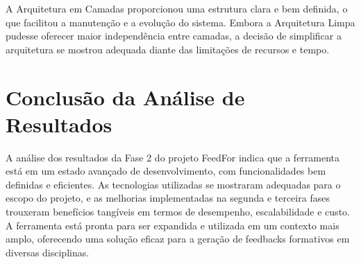 A Arquitetura em Camadas proporcionou uma estrutura clara e bem definida, o que facilitou a manutenção e a evolução do sistema. Embora a Arquitetura Limpa pudesse oferecer maior independência entre camadas, a decisão de simplificar a arquitetura se mostrou adequada diante das limitações de recursos e tempo.

\section{Conclusão da Análise de Resultados}

A análise dos resultados da Fase 2 do projeto FeedFor indica que a ferramenta está em um estado avançado de desenvolvimento, com funcionalidades bem definidas e eficientes. As tecnologias utilizadas se mostraram adequadas para o escopo do projeto, e as melhorias implementadas na segunda e terceira fases trouxeram benefícios tangíveis em termos de desempenho, escalabilidade e custo. A ferramenta está pronta para ser expandida e utilizada em um contexto mais amplo, oferecendo uma solução eficaz para a geração de feedbacks formativos em diversas disciplinas.
